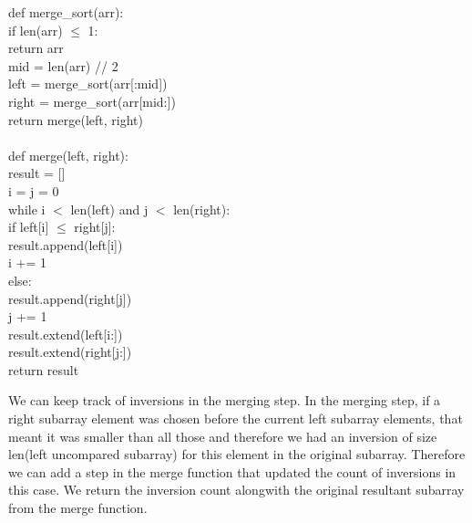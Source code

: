 \documentclass{article}[12pt]
\begin{document}
\begin{enumerate}
def merge\_sort(arr):\\
\hspace*{2em}if len(arr) $\leq$ 1:\\
\hspace*{3em}return arr\\
\hspace*{2em}mid = len(arr) // 2\\
\hspace*{2em}left = merge\_sort(arr[:mid])\\
\hspace*{2em}right = merge\_sort(arr[mid:])\\
\hspace*{2em}return merge(left, right)\\

\\
def merge(left, right):\\
\hspace*{2em}result = []\\
\hspace*{2em}i = j = 0\\
\hspace*{2em}while i $<$ len(left) and j $<$ len(right):\\
\hspace*{3em}if left[i] $\leq$ right[j]:\\
\hspace*{4em}result.append(left[i])\\
\hspace*{4em}i += 1\\
\hspace*{3em}else:\\
\hspace*{4em}result.append(right[j])\\
\hspace*{4em}j += 1\\
\hspace*{2em}result.extend(left[i:])\\
\hspace*{2em}result.extend(right[j:])\\
\hspace*{2em}return result

We can keep track of inversions in the merging step. In the merging step,  if a right subarray element was chosen before the current left subarray elements, that meant it was smaller than all those and therefore we had an inversion of size len(left uncompared subarray) for this element in the original subarray. Therefore we can add a step in the merge function that updated the count of inversions in this case. We return the inversion count alongwith the original resultant subarray from the merge function.


\end{enumerate}
\end{document}
